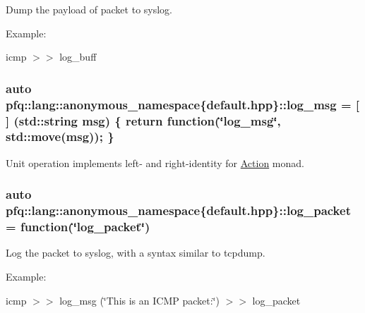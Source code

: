 Dump the payload of packet to syslog. 

Example\+:

icmp $>$$>$ log\+\_\+buff 
\subsubsection[{\texorpdfstring{log\+\_\+msg}{log_msg}}]{\setlength{\rightskip}{0pt plus 5cm}auto pfq\+::lang\+::anonymous\+\_\+namespace\{default.\+hpp\}\+::log\+\_\+msg = \mbox{[}$\,$\mbox{]} (std\+::string msg) \{ return {\bf function}(\char`\"{}log\+\_\+msg\char`\"{}, std\+::move(msg)); \}}\hypertarget{namespacepfq_1_1lang_1_1anonymous__namespace_02default_8hpp_03_a82e76226844f043aac9a2dd01615c9bb}{}\label{namespacepfq_1_1lang_1_1anonymous__namespace_02default_8hpp_03_a82e76226844f043aac9a2dd01615c9bb}


Unit operation implements left-\/ and right-\/identity for \hyperlink{structpfq_1_1lang_1_1Action}{Action} monad. 

\subsubsection[{\texorpdfstring{log\+\_\+packet}{log_packet}}]{\setlength{\rightskip}{0pt plus 5cm}auto pfq\+::lang\+::anonymous\+\_\+namespace\{default.\+hpp\}\+::log\+\_\+packet = {\bf function}(\char`\"{}log\+\_\+packet\char`\"{})}\hypertarget{namespacepfq_1_1lang_1_1anonymous__namespace_02default_8hpp_03_aed6076a98aece625738cbda3689183e2}{}\label{namespacepfq_1_1lang_1_1anonymous__namespace_02default_8hpp_03_aed6076a98aece625738cbda3689183e2}


Log the packet to syslog, with a syntax similar to tcpdump. 

Example\+:

icmp $>$$>$ log\+\_\+msg (\char`\"{}\+This is an I\+C\+M\+P packet\+:\char`\"{}) $>$$>$ log\+\_\+packet 
